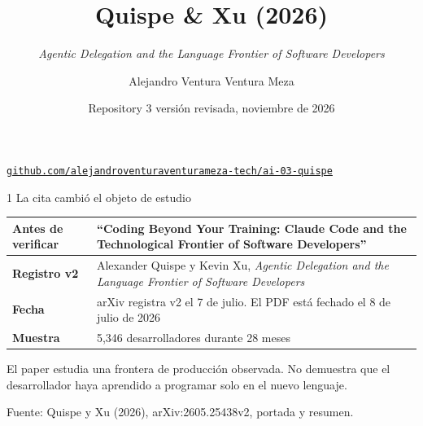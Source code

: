 \documentclass[aspectratio=169,11pt]{beamer}
\title{Quispe \& Xu (2026)}
\subtitle{\emph{Agentic Delegation and the Language Frontier of Software Developers}}
\author{Alejandro Ventura Ventura Meza}
\date{Repository 3 \textperiodcentered{} versión revisada, noviembre de 2026}
\newcommand{\sourcefoot}[1]{\vfill{\scriptsize\color{black!60}Fuente: #1}}
\begin{document}
\begin{frame}[plain]
  \titlepage
  \begin{center}\small
    \href{https://github.com/alejandroventuraventurameza-tech/ai-03-quispe}
      {\texttt{github.com/alejandroventuraventurameza-tech/ai-03-quispe}}
  \end{center}
\end{frame}

\begin{frame}{1 \textperiodcentered{} La cita cambió el objeto de estudio}
  \begin{tabularx}{\textwidth}{@{}>{\bfseries}p{}X@{}}
    \toprule
    Antes de verificar & ``Coding Beyond Your Training: Claude Code and the Technological Frontier of Software Developers'' \\
    \midrule
    Registro v2 & Alexander Quispe y Kevin Xu, \emph{Agentic Delegation and the Language Frontier of Software Developers} \\
    \midrule
    Fecha & arXiv registra v2 el 7 de julio. El PDF está fechado el 8 de julio de 2026 \\
    \midrule
    Muestra & 5,346 desarrolladores durante 28 meses \\
    \bottomrule
  \end{tabularx}

  \medskip
  El paper estudia una \alert{frontera de producción observada}. No demuestra
  que el desarrollador haya aprendido a programar solo en el nuevo lenguaje.

  \sourcefoot{Quispe y Xu (2026), arXiv:2605.25438v2, portada y resumen.}
\end{frame}
\end{document}
